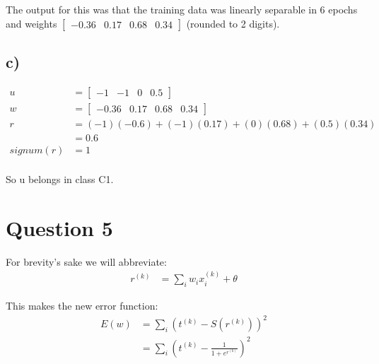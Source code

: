 \documentclass[12pt,a4paper]{article}
\begin{document}
The output for this was that the training data was linearly separable in 6 epochs and weights $\begin{bmatrix}
	-0.36 & 0.17 & 0.68 & 0.34
\end{bmatrix}$ (rounded to 2 digits).

\subsection*{c)}
\label{sub:c_}
\begin{align*}
	u &= \begin{bmatrix}
		-1 & -1 & 0 & 0.5
	\end{bmatrix}\\
	w &= \begin{bmatrix}
		-0.36 & 0.17 & 0.68 & 0.34
	\end{bmatrix}\\
	r &= (-1)(-0.6) + (-1)(0.17) + (0)(0.68) + (0.5)(0.34)\\
	&= 0.6\\
	signum(r) &= 1\\
\end{align*}

So u belongs in class C1.

\section*{Question 5}
\label{sec:question_5}
For brevity's sake we will abbreviate:
\begin{align}
	r^{(k)} &= \sum_i w_ix_i^{(k)}+\theta
\end{align}

This makes the new error function:
\begin{align*}
	E(w) &= \sum_i \left( t^{(k)} - S(r^{(k)}) \right)^2\\
	&= \sum_i \left( t^{(k)} - \frac{1}{1+e^{r^{(k)}}} \right)^2\\
\end{align*}
\end{document}
